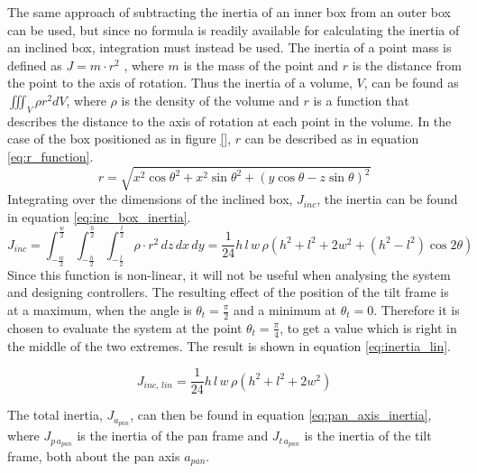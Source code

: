 \documentclass[../../main.tex]{subfiles}
\begin{document}
The same approach of subtracting the inertia of an inner box from an outer box can be used, but since no formula is readily available for calculating the inertia of an inclined box, integration must instead be used. The inertia of a point mass is defined as $J=m\cdot r^2$ \cite{PrincipalsOfPhysics}, where $m$ is the mass of the point and $r$ is the distance from the point to the axis of rotation. Thus the inertia of a volume, $V$, can be found as $\iiint_V \rho r^2 dV$, where $\rho$ is the density of the volume and $r$ is a function that describes the distance to the axis of rotation at each point in the volume. In the case of the box positioned as in figure \ref{}, $r$ can be described as in equation \ref{eq:r_function}.
\begin{equation}\label{eq:r_function}
    r = \sqrt{x^2\cos{\theta}^2+x^2\sin{\theta}^2+(y\cos{\theta}-z\sin{\theta})^2}
\end{equation}
Integrating over the dimensions of the inclined box, $J_{inc}$, the inertia can be found in equation \ref{eq:inc_box_inertia}.
\begin{equation}\label{eq:inc_box_inertia}
    J_{inc} = \int_{-\frac{w}{2}}^{\frac{w}{2}}
        \int_{-\frac{h}{2}}^{\frac{h}{2}}
        \int_{-\frac{l}{2}}^{\frac{l}{2}}
        \rho \cdot r^2 \,dz \,dx \,dy = \frac{1}{24}h\,l\,w\, \rho (h^2+l^2+2w^2+(h^2-l^2)\cos{2\theta})
\end{equation}
Since this function is non-linear, it will not be useful when analysing the system and designing controllers. The resulting effect of the position of the tilt frame is at a maximum, when the angle is $\theta_{t}=\frac{\pi}{2}$ and a minimum at $\theta_t=0$. Therefore it is chosen to evaluate the system at the point $\theta_t = \frac{\pi}{4}$, to get a value which is right in the middle of the two extremes. The result is shown in equation \ref{eq:inertia_lin}.

\begin{equation}\label{eq:inertia_lin}
    J_{inc,\,lin} = \frac{1}{24}h\,l\,w\, \rho (h^2+l^2+2w^2)
\end{equation}

The total inertia, $J_{a_{pan}}$, can then be found in equation \ref{eq:pan_axis_inertia}, where $J_{p\,a_{pan}}$ is the inertia of the pan frame and $J_{t\,a_{pan}}$ is the inertia of the tilt frame, both about the pan axis $a_{pan}$.
\end{document}
